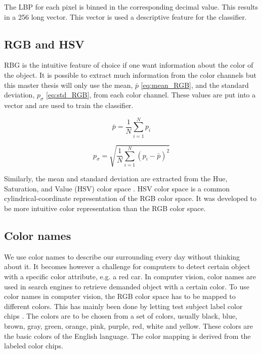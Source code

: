 The LBP for each pixel is binned in the corresponding decimal value. This results in a 256 long vector. This vector is used a descriptive feature for the classifier. 

\subsection{RGB and HSV} \label{subsection:RGB_HSV}

RBG is the intuitive feature of choice if one want information about the color of the object. It is possible to extract much information from the color channels but this master thesis will only use the mean, $\bar{p}$ \cref{eq:mean_RGB}, and the standard deviation, $p_{\sigma}$ \cref{eq:std_RGB}, from each color channel. These values are put into a vector and are used to train the classifier.  

\begin{equation} \label{eq:mean_RGB}
\bar{p} = \frac{1}{N}\sum_{i = 1}^{N} p_i
\end{equation}

\begin{equation} \label{eq:std_RGB}
p_{\sigma} = \sqrt{\frac{1}{N}\sum_{i = 1}^{N}(p_i - \bar{p})^2}
\end{equation}

Similarly, the mean and standard deviation are extracted from the Hue, Saturation, and Value (HSV) color space \cite{hsv_color}. HSV color space is a common cylindrical-coordinate representation of the RGB color space. It was developed to be more intuitive color representation than the RGB color space.  

\subsection{Color names} \label{subsection:Color}

We use color names to describe our surrounding every day without thinking about it. It becomes however a challenge for computers to detect certain object with a specific color attribute, e.g. a red car. In computer vision, color names are used in search engines to retrieve demanded object with a certain color. To use color names in computer vision, the RGB color space has to be mapped to different colors. This has mainly been done by letting test subject label color chips \cite{griffin2006optimality}. The colors are to be chosen from a set of colors, usually black, blue, brown, gray, green, orange, pink, purple, red, white and yellow. These colors are the basic colors of the English language. The color mapping is derived from the labeled color chips. 

